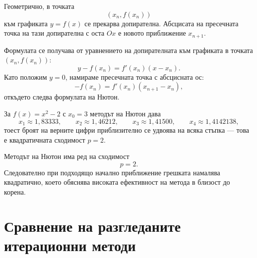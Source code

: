 Геометрично, в точката
\[
(x_n,f(x_n))
\]
към графиката $y=f(x)$ се прекарва допирателна. Абсцисата на пресечната точка на тази допирателна с оста $Ox$ е новото приближение $x_{n+1}$.

Формулата се получава от уравнението на допирателната към графиката в точката $(x_n,f(x_n))$:
\[
y-f(x_n)=f'(x_n)(x-x_n).
\]
Като положим $y=0$, намираме пресечната точка с абсцисната ос:
\[
-f(x_n)=f'(x_n)(x_{n+1}-x_n),
\]
откъдето следва формулата на Нютон.

\begin{lecfigure}
\end{lecfigure}

\begin{example}
За $f(x)=x^2-2$ с $x_0=3$ методът на Нютон дава
\[
x_1\approx1{,}83333,\qquad
x_2\approx1{,}46212,\qquad
x_3\approx1{,}41500,\qquad
x_4\approx1{,}4142138,
\]
тоест броят на верните цифри приблизително се удвоява на всяка стъпка --- това е
квадратичната сходимост $p=2$.
\end{example}

Методът на Нютон има ред на сходимост
\[
p=2.
\]
Следователно при подходящо начално приближение грешката намалява квадратично, което обяснява високата ефективност на метода в близост до корена.

\section{Сравнение на разгледаните итерационни методи}\label{s:34.5}

